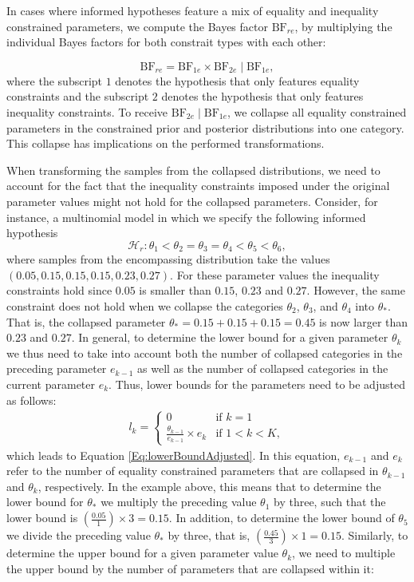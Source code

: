 \begin{appendix}
In cases where informed hypotheses feature a mix of equality and
inequality constrained parameters, we compute the Bayes factor
\(\text{BF}_{re}\), by multiplying the individual Bayes factors for both
constrait types with each other:

\[
\text{BF}_{re}
= \text{BF}_{1e} \times \text{BF}_{2e} \mid \text{BF}_{1e},
\] where the subscript \(1\) denotes the hypothesis that only features
equality constraints and the subscript \(2\) denotes the hypothesis that
only features inequality constraints. To receive
\(\text{BF}_{2e} \mid \text{BF}_{1e}\), we collapse all equality
constrained parameters in the constrained prior and posterior
distributions into one category. This collapse has implications on the
performed transformations.

When transforming the samples from the collapsed distributions, we need
to account for the fact that the inequality constraints imposed under
the original parameter values might not hold for the collapsed
parameters. Consider, for instance, a multinomial model in which we
specify the following informed hypothesis
\[\mathcal{H}_r: \theta_1 < \theta_2 = \theta_3 = \theta_4 < \theta_5 < \theta_6,\]
where samples from the encompassing distribution take the values
\((0.05, 0.15, 0.15, 0.15, 0.23, 0.27)\). For these parameter values the
inequality constraints hold since \(0.05\) is smaller than \(0.15\),
\(0.23\) and \(0.27\). However, the same constraint does not hold when
we collapse the categories \(\theta_2\), \(\theta_3\), and \(\theta_4\)
into \(\theta_*\). That is, the collapsed parameter
\(\theta_* = 0.15 + 0.15 + 0.15 = 0.45\) is now larger than \(0.23\) and
\(0.27\). In general, to determine the lower bound for a given parameter
\(\theta_k\) we thus need to take into account both the number of
collapsed categories in the preceding parameter \(e_{k-1}\) as well as
the number of collapsed categories in the current parameter \(e_{k}\).
Thus, lower bounds for the parameters need to be adjusted as follows:
\begin{align*}
  l_k = \left.
  \begin{cases}
      0 & \text{if } k = 1 \\
      \frac{\theta_{k - 1}}{e_{k-1}} \times e_k & \text{if } 1 < k < K,
  \end{cases}
    \right.
\end{align*} which leads to Equation \ref{Eq:lowerBoundAdjusted}. In
this equation, \(e_{k-1}\) and \(e_k\) refer to the number of equality
constrained parameters that are collapsed in \(\theta_{k - 1}\) and
\(\theta_{k}\), respectively. In the example above, this means that to
determine the lower bound for \(\theta_*\) we multiply the preceding
value \(\theta_1\) by three, such that the lower bound is
\(\left(\frac{0.05}{1}\right)\times 3 = 0.15\). In addition, to
determine the lower bound of \(\theta_5\) we divide the preceding value
\(\theta_*\) by three, that is,
\(\left(\frac{0.45}{3}\right) \times 1 = 0.15\). Similarly, to determine
the upper bound for a given parameter value \(\theta_{k}\), we need to
multiple the upper bound by the number of parameters that are collapsed
within it:


\end{appendix}
